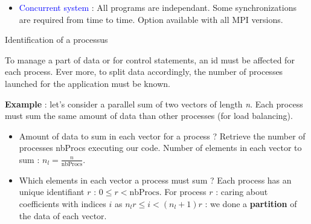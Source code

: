 \documentclass{beamer}
\begin{document}
\begin{frame}
\begin{itemize}
\begin{minipage}{55mm}
\begin{figure}
    \end{figure}
  \end{minipage}
\item \textcolor{blue}{Concurrent system} : All programs are independant. Some synchronizations
  are required from time to time. Option available with all MPI versions.
\end{itemize}
\end{frame}

\begin{frame}{Identification of a processus}

To manage a part of data or for control statements, an id must be affected for each process.
Ever more, to split data accordingly, the number of processes launched for the application must be known.

\textbf{Example} : let's consider a parallel sum of two vectors of length \textsl{n}. Each process must sum the same amount of data
than other processes (for load balancing).
\begin{itemize}
\item Amount of data to sum in each vector for a process ? Retrieve the number of processes nbProcs executing our code.
Number of elements in each vector to sum : $n_{l} = \frac{n}{\mathrm{nbProcs}}$.
\item Which elements in each vector a process must sum ? Each process has an unique identifiant $r$ : $0\leq r < \mathrm{nbProcs}$.
For process $r$ : caring about coefficients with indices $i$ as $n_{l}r \leq i < (n_{l}+1)r$ : we done a \textbf{partition} of the
data of each vector.
\end{itemize}

\end{frame}
\end{document}
